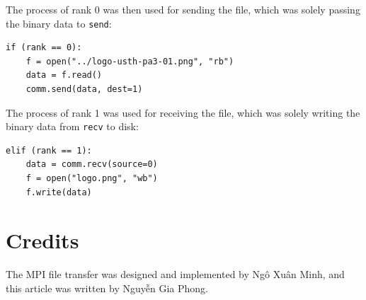 \documentclass{article}
\begin{document}
The process of rank 0 was then used for sending the file,
which was solely passing the binary data to \verb|send|:
\begin{verbatim}
if (rank == 0):
    f = open("../logo-usth-pa3-01.png", "rb")
    data = f.read()
    comm.send(data, dest=1)
\end{verbatim}

The process of rank 1 was used for receiving the file,
which was solely writing the binary data from \verb|recv| to disk:
\begin{verbatim}
elif (rank == 1):
    data = comm.recv(source=0)
    f = open("logo.png", "wb")
    f.write(data)
\end{verbatim}

\section{Credits}
The MPI file transfer was designed and implemented
by {Ngô Xuân Minh}, and this article was written
by {Nguyễn Gia Phong}.
\end{document}

